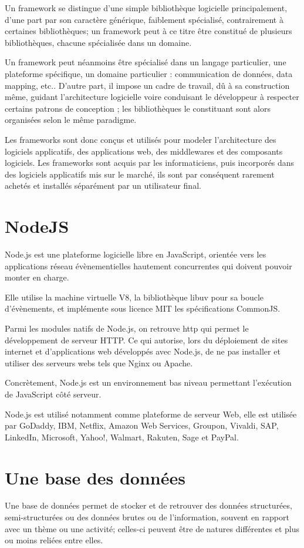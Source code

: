Un framework se distingue d'une simple bibliothèque logicielle principalement,
d'une part par son caractère générique, faiblement spécialisé, contrairement à
certaines bibliothèques; un framework peut à ce titre être constitué de plusieurs
bibliothèques, chacune spécialisée dans un domaine.

Un framework peut néanmoins être spécialisé dans un langage particulier,
une plateforme spécifique, un domaine particulier : communication de données,
data mapping, etc.. D'autre part, il impose un cadre de travail, dû à sa construction même,
 guidant l'architecture logicielle voire conduisant le développeur à respecter certains
 patrons de conception ; les bibliothèques le constituant sont alors organisées selon le même paradigme.

Les frameworks sont donc conçus et utilisés pour modeler l'architecture des logiciels applicatifs,
des applications web, des middlewares et des composants logiciels. Les frameworks sont
acquis par les informaticiens, puis incorporés dans des logiciels applicatifs mis sur
le marché, ils sont par conséquent rarement achetés et installés séparément par un utilisateur final.

\section{NodeJS}\label{sec:nodejs}
Node.js est une plateforme logicielle libre en JavaScript, orientée vers les applications
réseau évènementielles hautement concurrentes qui doivent pouvoir monter en charge.

Elle utilise la machine virtuelle V8, la bibliothèque libuv pour sa boucle d'évènements,
et implémente sous licence MIT les spécifications CommonJS.

Parmi les modules natifs de Node.js, on retrouve http qui permet le développement de
serveur HTTP. Ce qui autorise, lors du déploiement de sites internet et d'applications
web développés avec Node.js, de ne pas installer et utiliser des serveurs webs tels que Nginx ou Apache.

Concrètement, Node.js est un environnement bas niveau permettant l'exécution de JavaScript côté serveur.

Node.js est utilisé notamment comme plateforme de serveur Web, elle est utilisée par GoDaddy, IBM,
Netflix, Amazon Web Services, Groupon, Vivaldi, SAP, LinkedIn, Microsoft, Yahoo!,
Walmart, Rakuten, Sage et PayPal.

\section{Une base des données}\label{sec:base-de-donnees}
Une base de données permet de stocker et de retrouver des données structurées,
semi-structurées ou des données brutes ou de l'information, souvent en
rapport avec un thème ou une activité; celles-ci peuvent être de
natures différentes et plus ou moins reliées entre elles.

